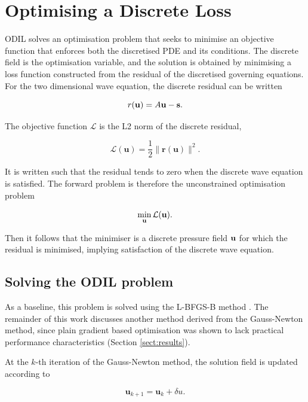 \documentclass[final-report]{report-template}
\begin{document}
\section{Optimising a Discrete Loss}

ODIL solves an optimisation problem that seeks to minimise an objective function that enforces both the discretised PDE and its conditions. The discrete field is the optimisation variable, and the solution is obtained by minimising a loss function constructed from the residual of the discretised governing equations. For the two dimensional wave equation, the discrete residual can be written

\begin{equation}
    r(\mathbf{u}) = A \bf u - s.
    \label{eq:residual}
\end{equation}

The objective function $\mathcal{L}$ is the L2 norm of the discrete residual, 

\begin{equation}
    \mathcal{L}(\mathbf{u}) = \frac 1 2 \|\mathbf{r}(\mathbf{u})\|^2.
    \label{eq:cont_loss}
\end{equation}

It is written such that the residual tends to zero when the discrete wave equation is satisfied. The forward problem is therefore the unconstrained optimisation problem

\begin{equation}
    \min_{\mathbf{u}}\mathcal{L}(\bf u).
\end{equation}

Then it follows that the minimiser is a discrete pressure field $\bf u$ for which the residual is minimised, implying satisfaction of the discrete wave equation.

\subsection{Solving the ODIL problem}

As a baseline, this problem is solved using the L-BFGS-B method \cite{xiao_new_2007}. The remainder of this work discusses another method derived from the Gauss-Newton method, since plain gradient based optimisation was shown to lack practical performance characteristics (Section \ref{sect:results}).

At the $k$-th iteration of the Gauss-Newton method, the solution field is updated according to 

\begin{equation}
    \mathbf{u}_{k+1} = \mathbf{u}_{k} + \delta u.
    \label{eq:gn-update}
\end{equation} 
\end{document}
